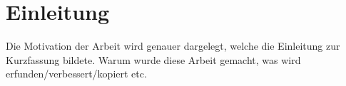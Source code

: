 \chapter{Einleitung}

Die Motivation der Arbeit wird genauer dargelegt, welche die Einleitung zur Kurzfassung bildete. Warum wurde diese Arbeit gemacht, was wird erfunden/verbessert/kopiert etc.

\lipsum[1-3]
